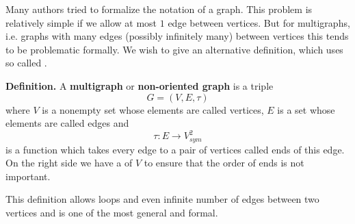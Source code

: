 \documentclass[12pt]{article}
\begin{document}
Many authors tried to formalize the notation of a graph. This problem is relatively simple if we allow at most $1$ edge between vertices. But for multigraphs, i.e. graphs with many edges (possibly infinitely many) between vertices this tends to be problematic formally. We wish to give an alternative definition, which uses so called .

\textbf{Definition.} A \textbf{multigraph} or \textbf{non-oriented graph} is a triple
$$G=(V,E,\tau)$$
where $V$ is a nonempty set whose elements are called vertices, $E$ is a set whose elements are called edges and
$$\tau:E\to V^2_{sym}$$
is a function which takes every edge to a pair of vertices called ends of this edge. On the right side we have a  of $V$ to ensure that the order of ends is not important.

This definition allows loops and even infinite number of edges between two vertices and is one of the most general and formal.
\end{document}
